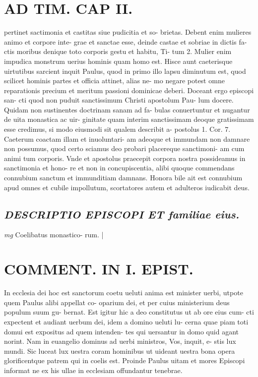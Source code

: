 \documentclass{article}
\begin{document}
\begin{pages}
\section*{AD TIM. CAP II. }
\marginpar{[ p.122 ]}\pstart pertinet sactimonia et castitas siue pudicitia et so- brietas. Debent enim mulieres animo et corpore inte- grae et sanctae esse, deinde castae et sobriae in dictis fa- ctis moribus denique toto corporis gestu et habitu, Ti- tum 2. Mulier enim impudica monstrum uerius hominis quam homo est. Hisce aunt caeterisque uirtutibus sarcient inquit Paulus, quod in primo illo lapsu diminutum est, quod scilicet hominis partes et officia attinet, alias ne- mo negare potest omne reparationis precium et meritum passioni dominicae deberi. Doceant ergo episcopi san- cti quod non puduit sanctissimum Christi apostolum Pau- lum docere. Quidam non sustinentes doctrinam sanam ad fa- bulas conuertuntur et nugantur de uita monastica ac uir- ginitate quam interim sanctissimam deoque gratissimam esse credimus, si modo eiusmodi sit qualem describit a- postolus 1. Cor. 7. Caeterum coactam illam et inuoluntari- am adeoque et immundam non damnare non possumus, quod certo sciamus deo probari placereque sanctimoni- am cum animi tum corporis. Vnde et apostolus praecepit corpora nostra possideamus in sanctimonia et hono- re et non in concupiscentia, alibi quoque commendans connubium sanctum et immunditiam damnans. Honora bile ait est connubium apud omnes et cubile impollutum, scortatores autem et adulteros iudicabit deus.  \pend
{}
{}
\subsection*{\textit{DESCRIPTIO EPISCOPI ET familiae eius. }}
\textit{mg}
\footnotesize Coelibatus monastico- rum. 
\normalsize| 
\section*{COMMENT. IN I. EPIST. }\pstart In ecclesia dei hoc est sanctorum coetu ueluti anima est minister uerbi, utpote quem Paulus alibi appellat co- oparium dei, et per cuius ministerium deus populum suum gu- bernat. Est igitur hic a deo constitutus ut ab ore eius cum- cti expectent et audiant uerbum dei, idem a domino ueluti lu- cerna quae piam toti domui est expositus ad quem intenden- tes qui uersantur in domo quid agant norint. Nam in euangelio dominus ad uerbi ministros, Vos, inquit, e- stis lux mundi. Sic luceat lux uestra coram hominibus ut uideant uestra bona opera glorificentque patrem qui in coelis est. Proinde Paulus uitam et mores Episcopi informat ne ex his ullae in ecclesiam offundantur tenebrae.  \pend
{}
{}

\end{pages}
\end{document}
